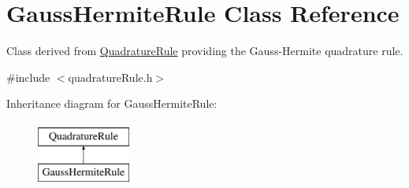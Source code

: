 \hypertarget{classGaussHermiteRule}{\section{Gauss\-Hermite\-Rule Class Reference}
\label{classGaussHermiteRule}
}


Class derived from \hyperlink{classQuadratureRule}{Quadrature\-Rule} providing the Gauss-\/\-Hermite quadrature rule.  




{\ttfamily \#include $<$quadrature\-Rule.\-h$>$}

Inheritance diagram for Gauss\-Hermite\-Rule\-:\begin{figure}[H]
\begin{center}
\leavevmode
\includegraphics[height=2.000000cm]{classGaussHermiteRule}
\end{center}
\end{figure}
